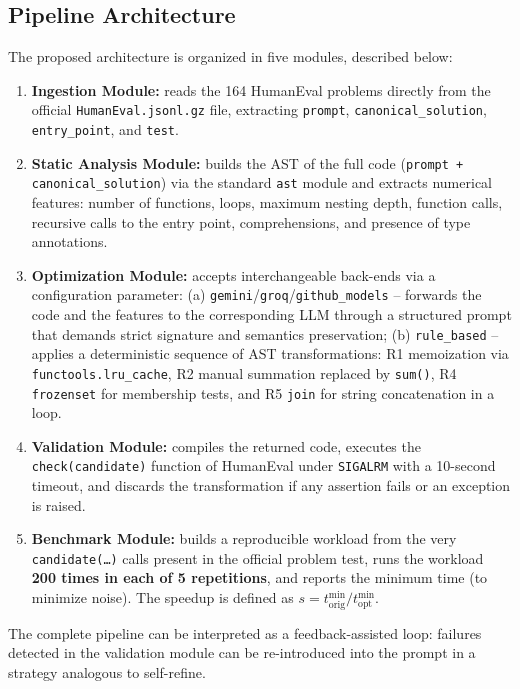 \documentclass[conference]{IEEEtran}
\begin{document}
\subsection{Pipeline Architecture}
The proposed architecture is organized in five modules, described below:

\begin{enumerate}
    \item \textbf{Ingestion Module:} reads the 164 HumanEval problems directly from the official \texttt{HumanEval.jsonl.gz} file, extracting \texttt{prompt}, \texttt{canonical\_solution}, \texttt{entry\_point}, and \texttt{test}.
    \item \textbf{Static Analysis Module:} builds the AST of the full code (\texttt{prompt + canonical\_solution}) via the standard \texttt{ast} module and extracts numerical features: number of functions, loops, maximum nesting depth, function calls, recursive calls to the entry point, comprehensions, and presence of type annotations.
    \item \textbf{Optimization Module:} accepts interchangeable back-ends via a configuration parameter: (a) \texttt{gemini}/\texttt{groq}/\texttt{github\_models} -- forwards the code and the features to the corresponding LLM through a structured prompt that demands strict signature and semantics preservation; (b) \texttt{rule\_based} -- applies a deterministic sequence of AST transformations: R1 memoization via \texttt{functools.lru\_cache}, R2 manual summation replaced by \texttt{sum()}, R4 \texttt{frozenset} for membership tests, and R5 \texttt{join} for string concatenation in a loop.
    \item \textbf{Validation Module:} compiles the returned code, executes the \texttt{check(candidate)} function of HumanEval under \texttt{SIGALRM} with a 10-second timeout, and discards the transformation if any assertion fails or an exception is raised.
    \item \textbf{Benchmark Module:} builds a reproducible workload from the very \texttt{candidate(\ldots)} calls present in the official problem test, runs the workload \textbf{200 times in each of 5 repetitions}, and reports the minimum time (to minimize noise). The speedup is defined as $s = t_\text{orig}^\text{min}/t_\text{opt}^\text{min}$.
\end{enumerate}

The complete pipeline can be interpreted as a feedback-assisted loop: failures detected in the validation module can be re-introduced into the prompt in a strategy analogous to self-refine.
\end{document}
